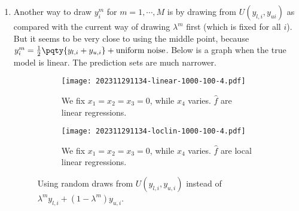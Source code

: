 \documentclass[12pt]{article}
\begin{document}
\begin{enumerate}
    \item Another way to draw \(y_{i}^{m}\) for \(m = 1,\cdots,M\)  is by drawing from \(U(y_{l,i}, y_{ui})\) as compared with the current way of drawing \(\lambda^{m}\) first (which is fixed for all \(i\)). But it seems to be very close to using the middle point, because \(y_{i}^{m} = \frac{1}{2} \pqty{y_{l,i} + y_{u,i}} + \text{uniform noise}\). Below is a graph  when the true model is linear. The prediction sets are much narrower. 
    \begin{figure}[h]
        \centering
        \begin{subfigure}[b]{0.45\textwidth}
            \texttt{[image: 202311291134-linear-1000-100-4.pdf]}
            \caption{We fix \(x_{1} = x_{2} = x_{3} = 0\), while \(x_{4}\) varies. \(\hat{f}\) are linear regressions.}
            \label{fig:13}
        \end{subfigure}
        \hfill
        \begin{subfigure}[b]{0.45\textwidth}
            \texttt{[image: 202311291134-loclin-1000-100-4.pdf]}
            \caption{We fix \(x_{1} = x_{2} = x_{3} = 0\), while \(x_{4}\) varies. \(\hat{f}\) are local linear regressions.}
            \label{fig:14}
        \end{subfigure}
    \caption{Using random draws from \(U(y_{l,i}, y_{u,i})\) instead of \(\lambda^{m}y_{l,i} + (1 - \lambda^{m}) y_{u,i}\).}
    \label{fig:comparison4}
    \end{figure}    
\end{enumerate}



\end{document}
